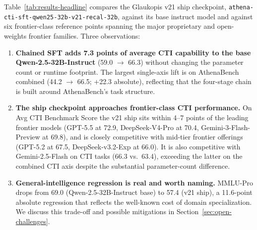 \documentclass[unnumsec,webpdf,contemporary,large]{oup-authoring-template}
\theoremstyle{thmstyleone}
\theoremstyle{thmstyletwo}
\theoremstyle{thmstylethree}
\begin{document}
Table~\ref{tab:results-headline} compares the Glaukopis v21 ship checkpoint, \texttt{athena-cti-sft-qwen25-32b-v21-recal-32b}, against its base instruct model and against six frontier-class reference points spanning the major proprietary and open-weights frontier families. Three observations:

\begin{enumerate}
  \item \textbf{Chained SFT adds 7.3 points of average CTI capability to the base Qwen-2.5-32B-Instruct} (59.0 $\to$ 66.3) without changing the parameter count or runtime footprint. The largest single-axis lift is on AthenaBench combined (44.2 $\to$ 66.5; +22.3 absolute), reflecting that the four-stage chain is built around AthenaBench's task structure.
  \item \textbf{The ship checkpoint approaches frontier-class CTI performance.} On Avg CTI Benchmark Score the v21 ship sits within 4--7 points of the leading frontier models (GPT-5.5 at 72.9, DeepSeek-V4-Pro at 70.4, Gemini-3-Flash-Preview at 69.8), and is closely competitive with mid-tier frontier offerings (GPT-5.2 at 67.5, DeepSeek-v3.2-Exp at 66.0). It is also competitive with Gemini-2.5-Flash on CTI tasks (66.3 vs.\ 63.4), exceeding the latter on the combined CTI axis despite the substantial parameter-count difference.
  \item \textbf{General-intelligence regression is real and worth naming.} MMLU-Pro drops from 69.0 (Qwen-2.5-32B-Instruct base) to 57.4 (v21 ship), a 11.6-point absolute regression that reflects the well-known cost of domain specialization. We discuss this trade-off and possible mitigations in Section~\ref{sec:open-challenges}.
\end{enumerate}
\end{document}
